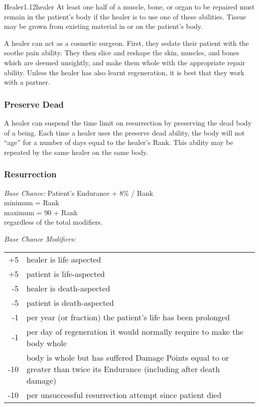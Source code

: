\begin{skill*}{Healer}{1.12}{healer}
At least one half of a muscle, bone, or organ to be repaired must
remain in the patient's body if the healer is to use one of these
abilities. Tissue may be grown from existing material in or on the
patient's body.

A healer can act as a cosmetic surgeon. First, they sedate their
patient with the soothe pain ability. They then slice and reshape the
skin, muscles, and bones which are deemed unsightly, and make them
whole with the appropriate repair ability. Unless the healer has also
learnt regeneration, it is best that they work with a partner.

\subsubsection{Preserve Dead}

A healer can suspend the time limit on resurrection by preserving the
dead body of a being. Each time a healer uses the preserve dead
ability, the body will not ``age'' for a number of days equal to the
healer's Rank. This ability may be repeated by the same healer on the
same body.

\subsubsection{Resurrection}

\emph{Base Chance:} Patient's Endurance + 8\% / Rank \\
\hspace*{2em} minimum = Rank \\
\hspace*{2em} maximum = 90 + Rank \\
\hspace*{2em} regardless of the total modifiers.

\emph{Base Chance Modifiers:}\\
\begin{tabularx}{\linewidth}{rX}
+5	& healer is life aspected \\
+5	& patient is life-aspected \\
-5	& healer is death-aspected \\
-5	& patient is death-aspected \\
-1	& per year (or fraction) the patient's life has been prolonged \\
-1	& per day of regeneration it would normally require to make the body whole \\
-10	& body is whole but has suffered Damage Points equal to or greater
 than twice its Endurance (including after death damage) \\
-10	& per unsuccessful resurrection attempt since patient died \\
\end{tabularx}


\end{skill*}
